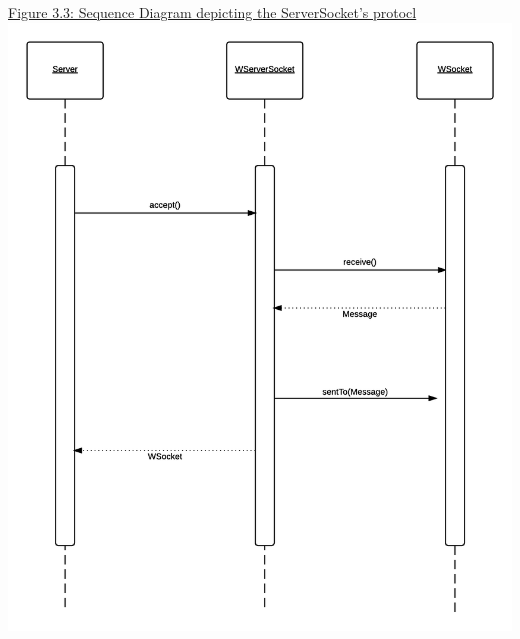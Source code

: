 \documentclass[11pt,english]{article}
\begin{document}
\newpage
\underline{Figure 3.3: Sequence Diagram depicting the ServerSocket's protocl} 
\vspace{5mm} \\
\includegraphics[width=6.2in]{figures/comm-protocol_seq-diagram_servsock.png}
\newpage
\end{document}
